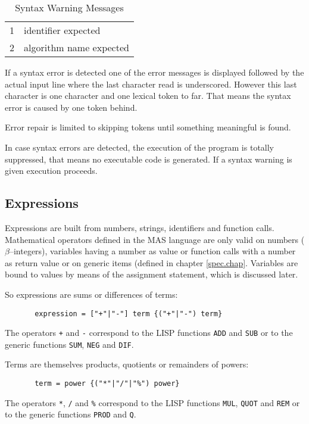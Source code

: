 \begin{table}
\begin{center}
\begin{tabular}{rl}
           1  & identifier expected \\
           2  & algorithm name expected \\
\end{tabular}
\caption{Syntax Warning Messages}
\label{tabSW}
\end{center}
\end{table}

If a syntax error is detected one of the error messages is
displayed followed by the actual input line where the last
character read is underscored. However this last character
is one character and one lexical token to far. That means 
the syntax error is caused by one token behind.

Error repair is limited to skipping tokens until 
something meaningful is found.

In case syntax errors are detected, the execution of the program 
is totally suppressed, that means no executable code is generated.
If a syntax warning is given execution proceeds.


\subsection{Expressions}

Expressions are built from numbers, strings, identifiers and
function calls. Mathematical operators defined in the 
MAS language are only valid on numbers ($\beta$--integers),
variables having a number as value or function calls with
a number as return value 
or on generic items (defined in chapter \ref{spec.chap}.
Variables are bound to values by means of the assignment 
statement, which is discussed later.

So expressions are sums or differences of terms:
\begin{verbatim}
       expression = ["+"|"-"] term {("+"|"-") term}
\end{verbatim}
The operators \verb/+/ and \verb/-/ correspond to
the LISP functions \verb/ADD/ and \verb/SUB/ 
or to the generic functions \verb/SUM/, \verb/NEG/ 
and \verb/DIF/.

Terms are themselves products, quotients or remainders 
of powers:
\begin{verbatim}
       term = power {("*"|"/"|"%") power}
\end{verbatim}
The operators \verb/*/, \verb./. and \verb/%/ correspond to
the LISP functions \verb/MUL/, \verb/QUOT/ and \verb/REM/ 
or to the generic functions \verb/PROD/ and \verb/Q/.


